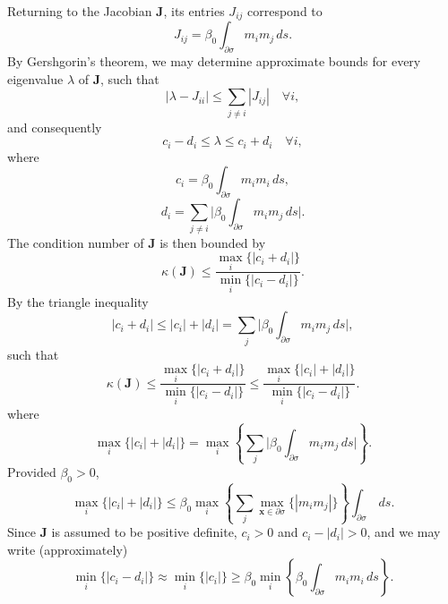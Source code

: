 Returning to the Jacobian $\mathbf{J}$, its entries $J_{ij}$ correspond to
\begin{equation}
        J_{ij} = \beta_0 \int_{\partial \sigma} m_i m_j \, ds.
\end{equation}
By Gershgorin's theorem, we may determine approximate bounds for every eigenvalue $\lambda$ of $\mathbf{J}$, such that
\begin{equation}
        | \lambda - J_{ii} | \leq \sum_{j \neq i} | J_{ij} | \quad \forall i,
\end{equation}
and consequently
\begin{equation}
        c_i - d_i \leq \lambda \leq c_i + d_i \quad \forall i,
\end{equation}
where
\begin{equation}
        c_i = \beta_0 \int_{\partial \sigma} m_i m_i \, ds,
\end{equation}
\begin{equation}
        d_i = \sum_{j \neq i} \bigg| \beta_0 \int_{\partial \sigma} m_i m_j \, ds \bigg|.
\end{equation}
The condition number of $\mathbf{J}$ is then bounded by
\begin{equation}
        \kappa (\mathbf{J}) \leq \frac{\max_i \{ | c_i + d_i | \}}{\min_i \{ | c_i - d_i | \}}.
\end{equation}
By the triangle inequality
\begin{equation}
        | c_i + d_i | \leq | c_i | + | d_i | = \sum_{j} \bigg| \beta_0 \int_{\partial \sigma} m_i m_j \, ds \bigg|,
\end{equation}
such that
\begin{equation}
        \kappa (\mathbf{J}) \leq \frac{\max_i \{ | c_i + d_i | \}}{\min_i \{ | c_i - d_i | \}} \leq \frac{\max_i \{ | c_i | + | d_i | \}}{\min_i \{ | c_i - d_i |  \}}.
\end{equation}
where
\begin{equation}
        \max_i \{ | c_i | + | d_i | \} = \max_i \left\{ \sum_{j} \bigg| \beta_0 \int_{\partial \sigma} m_i m_j \, ds \bigg| \right\}.
\end{equation}
Provided $\beta_0 > 0$,
\begin{equation}
        \max_i \{ | c_i | + | d_i | \} \leq \beta_0 \max_i \left\{ \sum_{j} \max_{\mathbf{x} \in \partial \sigma} \{ | m_i m_j | \} \right\} \int_{\partial \sigma} \, ds.
\end{equation}
Since $\mathbf{J}$ is assumed to be positive definite, $c_i > 0$ and $c_i - | d_i | > 0$, and we may write (approximately)
\begin{equation}
        \min_i \{ | c_i  - d_i | \} \approx \min_i \{ | c_i | \} \geq \beta_0 \min_i \left\{ \beta_0 \int_{\partial \sigma} m_i m_i \, ds \right\}.
\end{equation}

